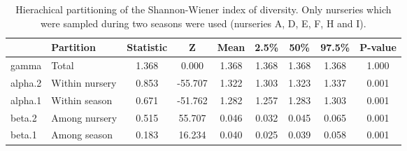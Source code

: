 \documentclass[12pt]{article}
\begin{document}
\begin{table}[ht]
\centering
\caption{Hierachical partitioning of the Shannon-Wiener index of diversity. Only nurseries which were sampled during two seasons were used (nurseries A, D, E, F, H and I).} 
\label{tab:adipart}
\begin{tabular}{llccccccc}
  \hline
 & \textbf{Partition} & \textbf{Statistic} & \textbf{Z} & \textbf{Mean} & \textbf{2.5\%} & \textbf{50\%} & \textbf{97.5\%} & \textbf{P-value} \\ 
  \hline
gamma & Total & 1.368 & 0.000 & 1.368 & 1.368 & 1.368 & 1.368 & 1.000 \\ 
  alpha.2 & Within nursery & 0.853 & -55.707 & 1.322 & 1.303 & 1.323 & 1.337 & 0.001 \\ 
  alpha.1 & Within season & 0.671 & -51.762 & 1.282 & 1.257 & 1.283 & 1.303 & 0.001 \\ 
  beta.2 & Among nursery & 0.515 & 55.707 & 0.046 & 0.032 & 0.045 & 0.065 & 0.001 \\ 
  beta.1 & Among season & 0.183 & 16.234 & 0.040 & 0.025 & 0.039 & 0.058 & 0.001 \\ 
   \hline
\end{tabular}
\end{table}
\end{document}
